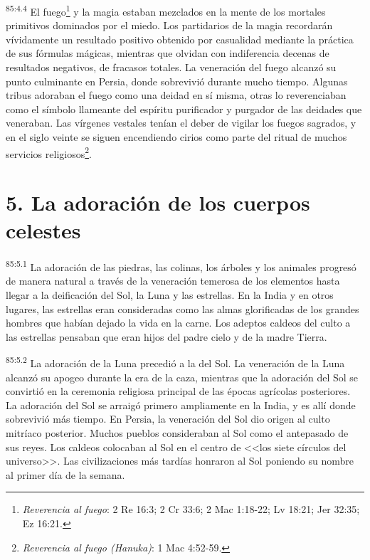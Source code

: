 \documentclass[twoside, 11pt]{book}
\begin{document}
\par
\textsuperscript{85:4.4} El fuego\footnote{\textit{Reverencia al fuego}: 2 Re 16:3; 2 Cr 33:6; 2 Mac 1:18-22; Lv 18:21; Jer 32:35; Ez 16:21.} y la magia estaban mezclados en la mente de los mortales primitivos dominados por el miedo. Los partidarios de la magia recordarán vívidamente un resultado positivo obtenido por casualidad mediante la práctica de sus fórmulas mágicas, mientras que olvidan con indiferencia decenas de resultados negativos, de fracasos totales. La veneración del fuego alcanzó su punto culminante en Persia, donde sobrevivió durante mucho tiempo. Algunas tribus adoraban el fuego como una deidad en sí misma, otras lo reverenciaban como el símbolo llameante del espíritu purificador y purgador de las deidades que veneraban. Las vírgenes vestales tenían el deber de vigilar los fuegos sagrados, y en el siglo veinte se siguen encendiendo cirios como parte del ritual de muchos servicios religiosos\footnote{\textit{Reverencia al fuego (Hanuka)}: 1 Mac 4:52-59.}.

\section*{5. La adoración de los cuerpos celestes}
\par
\textsuperscript{85:5.1} La adoración de las piedras, las colinas, los árboles y los animales progresó de manera natural a través de la veneración temerosa de los elementos hasta llegar a la deificación del Sol, la Luna y las estrellas. En la India y en otros lugares, las estrellas eran consideradas como las almas glorificadas de los grandes hombres que habían dejado la vida en la carne. Los adeptos caldeos del culto a las estrellas pensaban que eran hijos del padre cielo y de la madre Tierra.

\par
\textsuperscript{85:5.2} La adoración de la Luna precedió a la del Sol. La veneración de la Luna alcanzó su apogeo durante la era de la caza, mientras que la adoración del Sol se convirtió en la ceremonia religiosa principal de las épocas agrícolas posteriores. La adoración del Sol se arraigó primero ampliamente en la India, y es allí donde sobrevivió más tiempo. En Persia, la veneración del Sol dio origen al culto mitríaco posterior. Muchos pueblos consideraban al Sol como el antepasado de sus reyes. Los caldeos colocaban al Sol en el centro de <<los siete círculos del universo>>. Las civilizaciones más tardías honraron al Sol poniendo su nombre al primer día de la semana.
\end{document}
